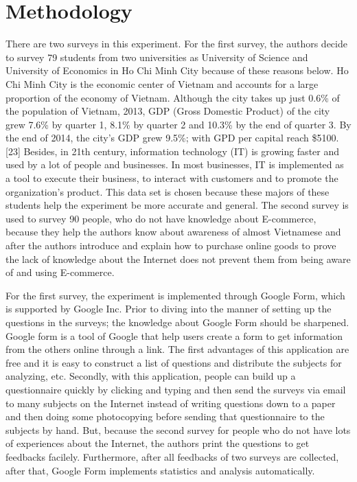\documentclass[conference]{IEEEtran}
\begin{document}
\section{Methodology}
There are two surveys in this experiment. For the first survey, the authors decide to survey 79 students from two universities as University of Science and University of Economics in Ho Chi Minh City because of these reasons below. Ho Chi Minh City is the economic center of Vietnam and accounts for a large proportion of the economy of Vietnam. Although the city takes up just 0.6\% of the population of Vietnam, 2013, GDP (Gross Domestic Product) of the city grew 7.6\% by quarter 1, 8.1\% by quarter 2 and 10.3\% by the end of quarter 3. By the end of 2014, the city’s GDP grew 9.5\%; with GPD per capital reach \$5100. [23] Besides, in 21th century, information technology (IT) is growing faster and used by a lot of people and businesses. In most businesses, IT is implemented as a tool to execute their business, to interact with customers and to promote the organization’s product. This data set is chosen because these majors of these students help the experiment be more accurate and general. 
The second survey is used to survey 90 people, who do not have knowledge about E-commerce, because they help the authors know about awareness of almost Vietnamese and after the authors introduce and explain how to purchase online goods to prove the lack of knowledge about the Internet does not prevent them from being aware of and using E-commerce.

For the first survey, the experiment is implemented through Google Form, which is supported by Google Inc. Prior to diving into the manner of setting up the questions in the surveys; the knowledge about Google Form should be sharpened. Google form is a tool of Google that help users create a form to get information from the others online through a link. The first advantages of this application are free and it is easy to construct a list of questions and distribute the subjects for analyzing, etc. Secondly, with this application, people can build up a questionnaire quickly by clicking and typing and then send the surveys via email to many subjects on the Internet instead of writing questions down to a paper and then doing some photocopying before sending that questionnaire to the subjects by hand. But, because the second survey for people who do not have lots of experiences about the Internet, the authors print the questions to get feedbacks facilely. Furthermore, after all feedbacks of two surveys are collected, after that, Google Form implements statistics and analysis automatically.
\end{document}
